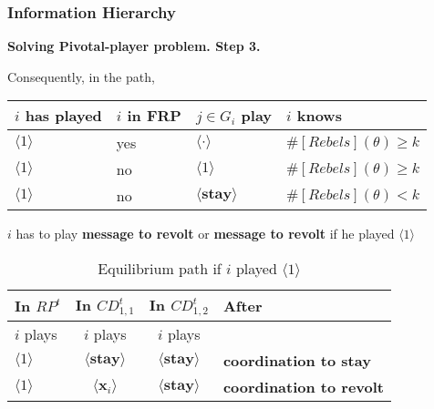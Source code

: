 \documentclass[10pt]{beamer}
\begin{document}
\begin{frame}
  \frametitle{Information Hierarchy}

\textbf{Solving Pivotal-player problem. Step 3.}

Consequently, in the path,

\begin{table}[h]
\begin{tabular}{l l l l}
$i$ has played  & $i$ in FRP & $j\in G_i$ play & $i$ knows \\
\hline
\hline
$\langle 1 \rangle$ & yes  & $\langle \cdot \rangle$ & $\#[Rebels](\theta)\geq k$ \\
$\langle 1 \rangle$&   no  & $\langle 1 \rangle$ & $\#[Rebels](\theta)\geq k$ \\
$\langle 1 \rangle$&   no  & $\langle \textbf{stay} \rangle$ & $\#[Rebels](\theta)< k$ \\

\end{tabular}
\end{table}

$i$ has to play \textbf{message to revolt} or \textbf{message to revolt} if he played $\langle 1 \rangle$

\begin{table}[ht]
\caption{Equilibrium path if $i$ played $\langle 1 \rangle$}
\label{Table_blf_up_cdt12}
\begin{center}
\begin{tabular}{l c c l}
In $RP^t$ 	 	&  	In $CD^t_{1,1}$		&  In $CD^t_{1,2}$	 & After \\
\hline
\hline
$i$ plays 		                             &  	$i$ plays		&				$i$ plays			& \\
\hline
$\langle 1 \rangle$ 		             &  \alert{$\langle \textbf{stay} \rangle$}	&	$\langle \textbf{stay} \rangle$ & \textbf{coordination to stay}\\
$\langle 1 \rangle$ 		             &  $\langle \mathbf{x}_i \rangle$	&	\alert{${\langle \textbf{stay} \rangle}$} & \textbf{coordination to revolt}\\
\end{tabular}
\end{center}
\end{table}
\end{frame}
\end{document}
